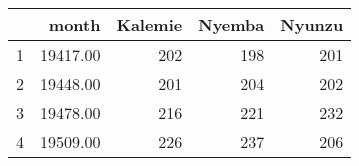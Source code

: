 \begin{table}[ht]
\centering
\begin{tabular}{rrrrr}
  \hline
 & month & Kalemie & Nyemba & Nyunzu \\ 
  \hline
1 & 19417.00 & 202 & 198 & 201 \\ 
  2 & 19448.00 & 201 & 204 & 202 \\ 
  3 & 19478.00 & 216 & 221 & 232 \\ 
  4 & 19509.00 & 226 & 237 & 206 \\ 
   \hline
\end{tabular}
\end{table}
